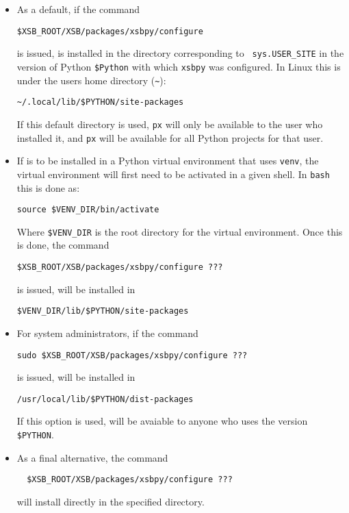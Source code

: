 \begin{itemize}
\item As a default, if the command

  {\tt \$XSB\_ROOT/XSB/packages/xsbpy/configure}

  is issued, \px{} is installed in the directory corresponding to {\tt
    sys.USER\_SITE} in the version of Python {\tt \$Python} with which
  {\tt xsbpy} was configured. In Linux this is under the users home
  directory (\verb|~|):
\begin{verbatim}
~/.local/lib/$PYTHON/site-packages
\end{verbatim}
If this default directory is used, {\tt px} will only be available to
the user who installed it, and {\tt px} will be available for all
Python projects for that user.

\item If \px{} is to be installed in a Python virtual environment
  that uses {\tt venv}, the virtual environment will first need to be
  activated in a given shell.  In {\tt bash} this is done as:

\begin{verbatim}
source $VENV_DIR/bin/activate
\end{verbatim}

Where {\tt \$VENV\_DIR} is the root directory for the virtual
environment.  Once this is done, the command

\begin{verbatim}  
$XSB_ROOT/XSB/packages/xsbpy/configure ???
\end{verbatim}

is issued, \px{} will be installed in 

\begin{verbatim}
$VENV_DIR/lib/$PYTHON/site-packages
\end{verbatim}

\item For system administrators, if the command

\begin{verbatim}  
sudo $XSB_ROOT/XSB/packages/xsbpy/configure ???
\end{verbatim}

  is issued, \px{} will be installed in

\begin{verbatim}  
/usr/local/lib/$PYTHON/dist-packages
\end{verbatim}  

  If this option is used, \px{} will be avaiable to anyone who uses
  the version {\tt \$PYTHON}.

\item As a final alternative, the command 

\begin{verbatim}  
  $XSB_ROOT/XSB/packages/xsbpy/configure ???
\end{verbatim}

will install \px{} directly in the specified directory.
\end{itemize}


